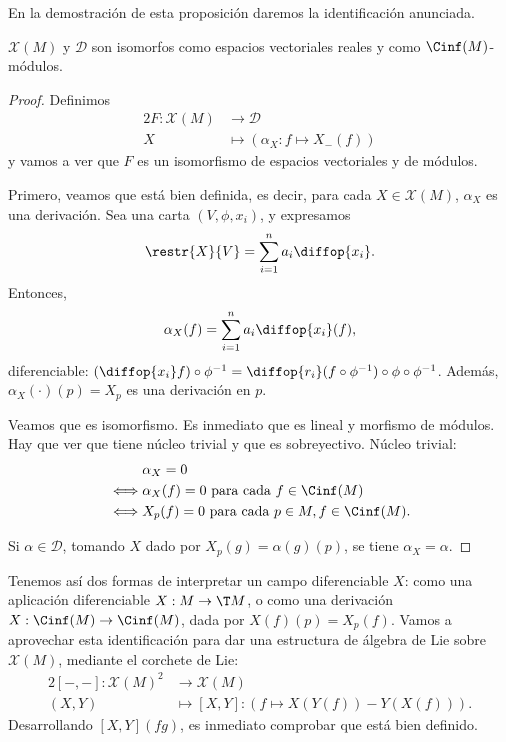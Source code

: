 En la demostración de esta proposición daremos la identificación anunciada.
\begin{nprop}
  $\mathscr{X}(M)$ y $\mathcal{D}$ son isomorfos como espacios vectoriales
  reales y como $\Cinf(M)$-módulos.
\end{nprop}
\begin{proof}
  Definimos
  \begin{alignat*}{2}
    F: \mathscr{X}(M) & \to \mathcal{D} \\
    X & \mapsto \left( \alpha_{X} : f\mapsto X_{-}(f) \right)
  \end{alignat*}
  y vamos a ver que $F$ es un isomorfismo de espacios vectoriales y de módulos.

  Primero, veamos que está bien definida, es decir, para cada $X\in
  \mathscr{X}(M)$, $\alpha_{X}$ es una derivación. Sea una carta
  $(V,\phi,x_{i})$, y expresamos
  \[
    \restr{X}{V} = \sum_{i=1}^{n} a_{i} \diffop{x_{i}}
    .\] Entonces,
  \[
    \alpha_{X}(f) = \sum_{i=1}^{n} a_{i} \diffop{x_{i}}(f)
    ,\] diferenciable: $(\diffop{x_{i}}f)\circ\phi^{-1} =
  \diffop{r_{i}}(f\circ\phi^{-1})\circ\phi\circ\phi^{-1}$. Además,
  $\alpha_{X}(\cdot)(p) = X_{p}$ es una derivación en $p$.

  Veamos que es isomorfismo. Es inmediato que es lineal y morfismo de
  módulos. Hay que ver que tiene núcleo trivial y que es sobreyectivo. Núcleo trivial:
  \begin{align*}
    & \alpha_{X} = 0 \\
    \iff & \alpha_{X}(f) = 0 \text{ para cada } f\in\Cinf(M) \\
    \iff & X_{p}(f) = 0 \text{ para cada } p\in M, f\in\Cinf(M).
  \end{align*}

  Si $\alpha\in \mathcal{D}$, tomando $X$ dado por $X_{p}(g) = \alpha(g)(p)$,
  se tiene $\alpha_{X} = \alpha$.
\end{proof}

Tenemos así dos formas de interpretar un campo diferenciable $X$: como una
aplicación diferenciable $X: M \to \T M$, o como una derivación $X:\Cinf(M)\to
\Cinf(M)$, dada por $X(f)(p) = X_{p}(f)$. Vamos a aprovechar esta identificación
para dar una estructura de álgebra de Lie sobre $\mathscr{X}(M)$, mediante el
corchete de Lie:
\begin{alignat*}{2}
  [-,-]: \mathscr{X}(M)^{2} & \to \mathscr{X}(M) \\
 (X,Y) & \mapsto [X,Y]: (f\mapsto X(Y(f))-Y(X(f))).
\end{alignat*}
Desarrollando $[X,Y](fg)$, es inmediato comprobar que está bien definido.

